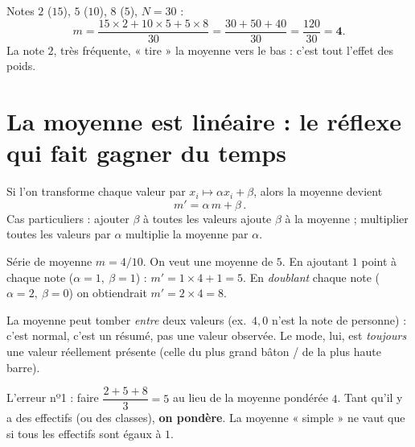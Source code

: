 \documentclass[11pt,a4paper]{article}
\begin{document}
\begin{exemple}
Notes $2$ ($15$), $5$ ($10$), $8$ ($5$), $N=30$ :
\[
m=\frac{15\times2+10\times5+5\times8}{30}=\frac{30+50+40}{30}=\frac{120}{30}=\mathbf{4}.
\]
La note $2$, très fréquente, « tire » la moyenne vers le bas : c'est tout l'effet des poids.
\end{exemple}

\section{La moyenne est linéaire : le réflexe qui fait gagner du temps}

\begin{propriete}
Si l'on transforme chaque valeur par $x_i\mapsto \alpha x_i+\beta$, alors la moyenne devient
\[
\boxed{\,m'=\alpha\,m+\beta\,.}
\]
Cas particuliers : ajouter $\beta$ à toutes les valeurs ajoute $\beta$ à la moyenne ;
multiplier toutes les valeurs par $\alpha$ multiplie la moyenne par $\alpha$.
\end{propriete}

\begin{exemple}
Série de moyenne $m=4/10$. On veut une moyenne de $5$. En ajoutant $1$ point à chaque note
($\alpha=1,\ \beta=1$) : $m'=1\times4+1=5$. \checkmark\;
En \emph{doublant} chaque note ($\alpha=2,\ \beta=0$) on obtiendrait $m'=2\times4=8$.
\end{exemple}

\begin{remarque}
La moyenne peut tomber \emph{entre} deux valeurs (ex.\ $4{,}0$ n'est la note de personne) : c'est
normal, c'est un résumé, pas une valeur observée. Le mode, lui, est \emph{toujours} une valeur
réellement présente (celle du plus grand bâton / de la plus haute barre).
\end{remarque}

\begin{attention}
L'erreur nº1 : faire $\dfrac{2+5+8}{3}=5$ au lieu de la moyenne pondérée $4$. Tant qu'il y a des
effectifs (ou des classes), \textbf{on pondère}. La moyenne « simple » ne vaut que si tous les
effectifs sont égaux à $1$.
\end{attention}
\end{document}
